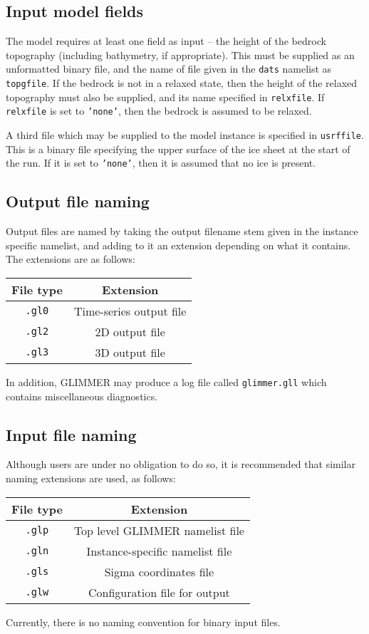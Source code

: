 \documentclass[11pt]{article}
\begin{document}
\subsection{Input model fields}
%
The model requires at least one field as input -- the height of the bedrock
topography (including bathymetry, if appropriate). This must be supplied as an
unformatted binary file, and the name of file given in the \texttt{dats}
namelist as \texttt{topgfile}. If the bedrock is not in a relaxed state, then
the height of the relaxed topography must also be supplied, and its name
specified in \texttt{relxfile}. If \texttt{relxfile} is set to \texttt{'none'},
then the bedrock is assumed to be relaxed.

A third file which may be supplied to the model instance is specified in
\texttt{usrffile}. This is a binary file specifying the upper surface of the
ice sheet at the start of the run. If it is set to \texttt{'none'}, then it is
assumed that no ice is present.
%
\subsection{Output file naming}
%
Output files are named by taking the output filename stem given in the
instance specific namelist, and adding to it an extension depending on what it
contains. The extensions are as follows:
%
\begin{center}
\begin{tabular}{|c|c|}
\hline
File type & Extension \\
\hline
\hline
\texttt{.gl0} & Time-series output file \\
\hline
\texttt{.gl2} & 2D output file \\
\hline
\texttt{.gl3} & 3D output file \\
\hline
\end{tabular}
\end{center}
%
In addition, GLIMMER may produce a log file called \texttt{glimmer.gll} which
contains miscellaneous diagnostics.
%
\subsection{Input file naming}
%
Although users are under no obligation to do so, it is recommended that
similar naming extensions are used, as follows:
%
\begin{center}
\begin{tabular}{|c|c|}
\hline
File type & Extension \\
\hline
\hline
\texttt{.glp} & Top level GLIMMER namelist file \\
\hline
\texttt{.gln} & Instance-specific namelist file \\
\hline
\texttt{.gls} & Sigma coordinates file \\
\hline
\texttt{.glw} & Configuration file for output \\
\hline
\end{tabular}
\end{center}
%
Currently, there is no naming convention for binary input files.
%
\end{document}
